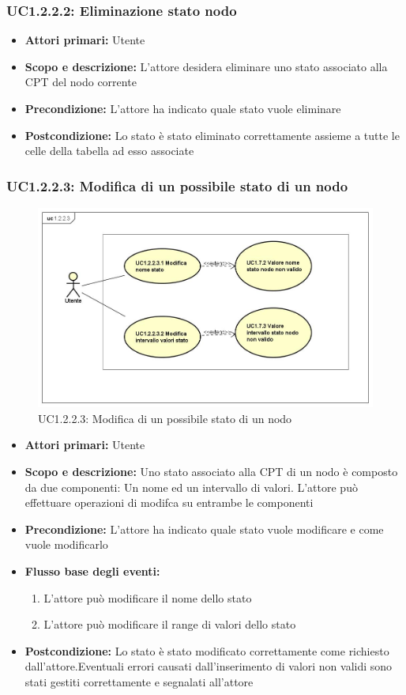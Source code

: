 \subsubsection{UC1.2.2.2: Eliminazione stato nodo} 
\begin{itemize} 
	\item{\textbf{Attori primari:} Utente} 
	\item{\textbf{Scopo e descrizione:} L'attore desidera eliminare uno stato associato alla CPT del nodo corrente} 
	\item{\textbf{Precondizione:} L'attore ha indicato quale stato vuole eliminare} 
	\item{\textbf{Postcondizione:} Lo stato è stato eliminato correttamente assieme a tutte le celle della tabella ad esso associate} 
\end{itemize} 
\subsubsection{UC1.2.2.3: Modifica di un possibile stato di un nodo} 
\begin{figure} [H]
	\centering
	\includegraphics[scale=0.45]{Img/UC1-2-2-3} 
	\caption{UC1.2.2.3: Modifica di un possibile stato di un nodo} \label{} 
\end{figure} 
\begin{itemize} 
	\item{\textbf{Attori primari:} Utente} 
	\item{\textbf{Scopo e descrizione:} Uno stato associato alla CPT di un nodo è composto da due componenti: Un nome ed un intervallo di valori. L'attore può effettuare operazioni di modifca su entrambe le componenti} 
	\item{\textbf{Precondizione:} L'attore ha indicato quale stato vuole modificare e come vuole modificarlo} 
	\item{\textbf{Flusso base degli eventi:} 
		\begin{enumerate} 
			\item{L'attore può modificare il nome dello stato} 
			\item{L'attore può modificare il range di valori dello stato} 
		\end{enumerate} 			
	} 
	\item{\textbf{Postcondizione:} Lo stato è stato modificato correttamente come richiesto dall'attore.Eventuali errori causati dall'inserimento di valori non validi sono stati gestiti correttamente e segnalati all'attore} 
\end{itemize} 
